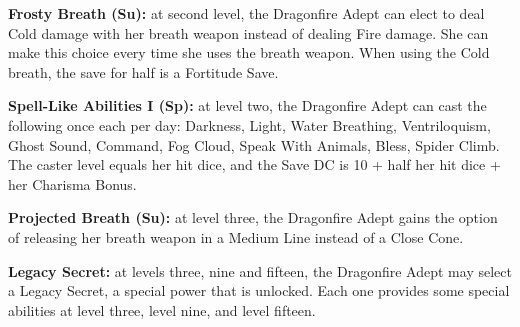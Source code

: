 \textbf{Frosty Breath (Su):} at second level, the Dragonfire Adept can elect to deal Cold damage with her breath weapon instead of dealing Fire damage. She can make this choice every time she uses the breath weapon. When using the Cold breath, the save for half is a Fortitude Save. 

\textbf{Spell-Like Abilities I (Sp):} at level two, the Dragonfire Adept can cast the following once each per day: Darkness, Light, Water Breathing, Ventriloquism, Ghost Sound, Command, Fog Cloud, Speak With Animals, Bless, Spider Climb. The caster level equals her hit dice, and the Save DC is 10 + half her hit dice + her Charisma Bonus. 

\textbf{Projected Breath (Su):} at level three, the Dragonfire Adept gains the option of releasing her breath weapon in a Medium Line instead of a Close Cone. 

\textbf{Legacy Secret:} at levels three, nine and fifteen, the Dragonfire Adept may select a Legacy Secret, a special power that is unlocked. Each one provides some special abilities at level three, level nine, and level fifteen.

